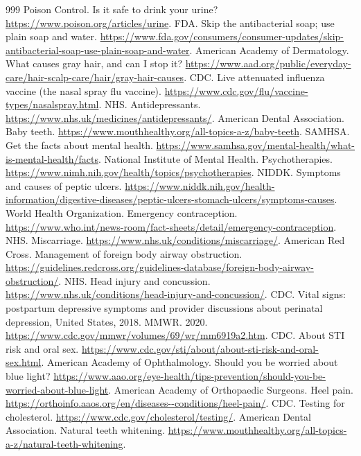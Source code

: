 \documentclass[11pt,oneside]{book}
\begin{document}
\begin{thebibliography}{999}
Poison Control. Is it safe to drink your urine? \url{https://www.poison.org/articles/urine}.
FDA. Skip the antibacterial soap; use plain soap and water. \url{https://www.fda.gov/consumers/consumer-updates/skip-antibacterial-soap-use-plain-soap-and-water}.
American Academy of Dermatology. What causes gray hair, and can I stop it? \url{https://www.aad.org/public/everyday-care/hair-scalp-care/hair/gray-hair-causes}.
CDC. Live attenuated influenza vaccine (the nasal spray flu vaccine). \url{https://www.cdc.gov/flu/vaccine-types/nasalspray.html}.
NHS. Antidepressants. \url{https://www.nhs.uk/medicines/antidepressants/}.
American Dental Association. Baby teeth. \url{https://www.mouthhealthy.org/all-topics-a-z/baby-teeth}.
SAMHSA. Get the facts about mental health. \url{https://www.samhsa.gov/mental-health/what-is-mental-health/facts}.
National Institute of Mental Health. Psychotherapies. \url{https://www.nimh.nih.gov/health/topics/psychotherapies}.
NIDDK. Symptoms and causes of peptic ulcers. \url{https://www.niddk.nih.gov/health-information/digestive-diseases/peptic-ulcers-stomach-ulcers/symptoms-causes}.
World Health Organization. Emergency contraception. \url{https://www.who.int/news-room/fact-sheets/detail/emergency-contraception}.
NHS. Miscarriage. \url{https://www.nhs.uk/conditions/miscarriage/}.
American Red Cross. Management of foreign body airway obstruction. \url{https://guidelines.redcross.org/guidelines-database/foreign-body-airway-obstruction/}.
NHS. Head injury and concussion. \url{https://www.nhs.uk/conditions/head-injury-and-concussion/}.
CDC. Vital signs: postpartum depressive symptoms and provider discussions about perinatal depression, United States, 2018. MMWR. 2020. \url{https://www.cdc.gov/mmwr/volumes/69/wr/mm6919a2.htm}.
CDC. About STI risk and oral sex. \url{https://www.cdc.gov/sti/about/about-sti-risk-and-oral-sex.html}.
American Academy of Ophthalmology. Should you be worried about blue light? \url{https://www.aao.org/eye-health/tips-prevention/should-you-be-worried-about-blue-light}.
American Academy of Orthopaedic Surgeons. Heel pain. \url{https://orthoinfo.aaos.org/en/diseases--conditions/heel-pain/}.
CDC. Testing for cholesterol. \url{https://www.cdc.gov/cholesterol/testing/}.
American Dental Association. Natural teeth whitening. \url{https://www.mouthhealthy.org/all-topics-a-z/natural-teeth-whitening}.

\end{thebibliography}
\end{document}
